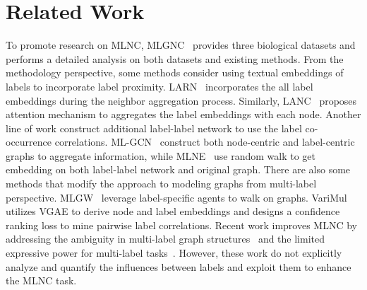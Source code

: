 \section{Related Work} \label{sec:related}

To promote research on MLNC, MLGNC~\citep{zhao2023multi} provides three biological datasets and performs a detailed analysis on both datasets and existing methods.
From the methodology perspective, some methods consider using textual embeddings of labels to incorporate label proximity.
LARN~\citep{XIAO2022235} incorporates the all label embeddings during the neighbor aggregation process. Similarly, LANC~\citep{ZHOU2021115063} proposes attention mechanism to aggregates the label embeddings with each node.
Another line of work construct additional label-label network to use the label co-occurrence correlations.
ML-GCN~\citep{gao2019semisupervised} construct both node-centric and label-centric graphs to aggregate information, while MLNE~\citep{8894391} use random walk to get embedding on both label-label network and original graph.
There are also some methods that modify the approach to modeling graphs from multi-label perspective.
MLGW~\citep{8970680} leverage label-specific agents to walk on graphs. VariMul~\citep{10.1145/3459637.3482391} utilizes VGAE to derive node and label embeddings and designs a confidence ranking loss to mine pairwise label correlations.
Recent work improves MLNC by addressing the ambiguity in multi-label graph structures~\citep{bei2024correlation} and the limited expressive power for multi-label tasks~\citep{zhao2024gnn}.
However, these work do not explicitly analyze and quantify the influences between labels and exploit them to enhance the MLNC task.

